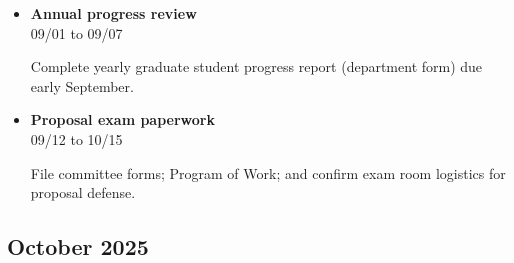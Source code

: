 \documentclass[landscape,a4paper]{article}
\begin{document}
\begin{itemize}[leftmargin=1cm, itemsep=0.8em]
    \item \textcolor{other}{\textbf{Annual progress review}}\\[0.2em]
          \textcolor{black!70}{\small 09/01 to 09/07}
\\[0.3em]
          \begin{minipage}[t]{0.85\textwidth}
          \textcolor{black!80}{Complete yearly graduate student progress report (department form) due early September.}
          \end{minipage}

    \item \textcolor{other}{\textbf{Proposal exam paperwork}}\\[0.2em]
          \textcolor{black!70}{\small 09/12 to 10/15}
\\[0.3em]
          \begin{minipage}[t]{0.85\textwidth}
          \textcolor{black!80}{File committee forms; Program of Work; and confirm exam room logistics for\\[0.1em]
          proposal defense.}
          \end{minipage}

\end{itemize}

\subsection*{October 2025}
\vspace{0.5cm}
\end{document}
